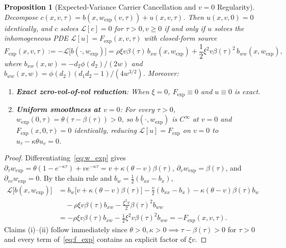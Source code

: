 \documentclass[preprint,12pt]{elsarticle}
\newtheorem{proposition}{Proposition}
\begin{document}
\begin{proposition}[Expected-Variance Carrier Cancellation and $v = 0$ Regularity]
\label{prop:const}
Decompose $c(x, v, \tau) = b(x, w_{\mathrm{exp}}(v, \tau)) + u(x, v, \tau)$. Then $u(x, v, 0) = 0$ identically, and $c$ solves $\mathcal{L}[c] = 0$ for $\tau > 0, v \ge 0$ if and only if $u$ solves the inhomogeneous PDE $\mathcal{L}[u] = F_{\mathrm{exp}}(x, v, \tau)$ with closed-form source
\begin{equation}
  F_{\mathrm{exp}}(x, v, \tau) := -\mathcal{L}\big[b(\cdot, w_{\mathrm{exp}})\big] = \rho\xi v\beta(\tau)\,b_{xw}(x, w_{\mathrm{exp}}) + \frac{1}{2}\xi^2 v\beta(\tau)^2\,b_{ww}(x, w_{\mathrm{exp}}),
  \label{eq:f_exp}
\end{equation}
where $b_{xw}(x,w) = -d_2 \phi(d_2)/(2w)$ and $b_{ww}(x,w) = \phi(d_2)(d_1 d_2 - 1)/(4 w^{3/2})$. Moreover:
\begin{enumerate}
  \item[(i)] \textbf{Exact zero-vol-of-vol reduction}: When $\xi = 0$, $F_{\mathrm{exp}} \equiv 0$ and $u \equiv 0$ is exact.
  \item[(ii)] \textbf{Uniform smoothness at $v = 0$}: For every $\tau > 0$, $w_{\mathrm{exp}}(0, \tau) = \theta(\tau - \beta(\tau)) > 0$, so $b(\cdot, w_{\mathrm{exp}})$ is $C^\infty$ at $v = 0$ and $F_{\mathrm{exp}}(x, 0, \tau) = 0$ identically, reducing $\mathcal{L}[u] = F_{\mathrm{exp}}$ on $v = 0$ to $u_\tau - \kappa\theta u_v = 0$.
\end{enumerate}
\end{proposition}
\begin{proof}
Differentiating~\eqref{eq:w_exp} gives $\partial_\tau w_{\mathrm{exp}} = \theta(1 - e^{-\kappa\tau}) + v e^{-\kappa\tau} = v + \kappa(\theta - v)\beta(\tau)$, $\partial_v w_{\mathrm{exp}} = \beta(\tau)$, and $\partial_{vv} w_{\mathrm{exp}} = 0$. By the chain rule and $b_w = \frac{1}{2}(b_{xx} - b_x)$,
\begin{align*}
  \mathcal{L}\big[b(x, w_{\mathrm{exp}})\big]
  &= b_w \big[v + \kappa(\theta - v)\beta(\tau)\big] - \frac{v}{2}(b_{xx} - b_x) - \kappa(\theta - v)\beta(\tau) b_w \\
  &\quad - \rho\xi v\beta(\tau) b_{xw} - \frac{\xi^2 v}{2}\beta(\tau)^2 b_{ww} \\
  &= -\rho\xi v\beta(\tau) b_{xw} - \frac{1}{2}\xi^2 v\beta(\tau)^2 b_{ww} = -F_{\mathrm{exp}}(x, v, \tau).
\end{align*}
Claims (i)--(ii) follow immediately since $\theta > 0, \kappa > 0 \implies \tau - \beta(\tau) > 0$ for $\tau > 0$ and every term of~\eqref{eq:f_exp} contains an explicit factor of $\xi v$.
\end{proof}
\end{document}
